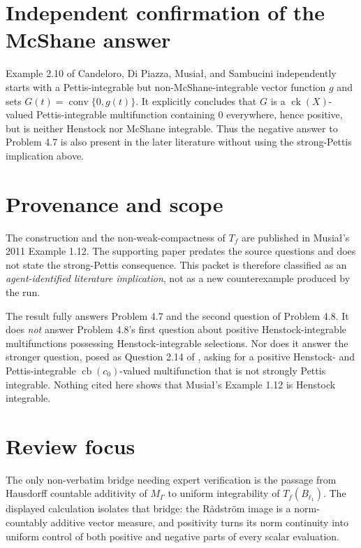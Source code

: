 \documentclass[11pt]{article}
\newcommand{\cb}{\operatorname{cb}}
\newcommand{\ck}{\operatorname{ck}}
\newcommand{\co}{\operatorname{conv}}
\begin{document}
\section*{Independent confirmation of the McShane answer}

Example 2.10 of Candeloro, Di Piazza, Musia{\l}, and Sambucini
\cite[PDF p.~9]{companion} independently starts with a Pettis-integrable but
non-McShane-integrable vector function $g$ and sets
$G(t)=\co\{0,g(t)\}$.  It explicitly concludes that $G$ is a
$\ck(X)$-valued Pettis-integrable multifunction containing $0$ everywhere,
hence positive, but is neither Henstock nor McShane integrable.  Thus the
negative answer to Problem 4.7 is also present in the later literature without
using the strong-Pettis implication above.

\section*{Provenance and scope}

The construction and the non-weak-compactness of $T_f$ are published in
Musia{\l}'s 2011 Example 1.12.  The supporting paper predates the source
questions and does not state the strong-Pettis consequence.  This packet is
therefore classified as an \emph{agent-identified literature implication},
not as a new counterexample produced by the run.

The result fully answers Problem 4.7 and the second question of Problem 4.8.
It does \emph{not} answer Problem 4.8's first question about positive
Henstock-integrable multifunctions possessing Henstock-integrable selections.
Nor does it answer the stronger question, posed as Question 2.14 of
\cite{companion}, asking for a positive Henstock- and Pettis-integrable
$\cb(c_0)$-valued multifunction that is not strongly Pettis integrable.
Nothing cited here shows that Musia{\l}'s Example 1.12 is Henstock integrable.

\section*{Review focus}

The only non-verbatim bridge needing expert verification is the passage from
Hausdorff countable additivity of $M_\Gamma$ to uniform integrability of
$T_f(B_{\ell_1})$.  The displayed calculation isolates that bridge: the
R\aa dstr\"om image is a norm-countably additive vector measure, and positivity
turns its norm continuity into uniform control of both positive and negative
parts of every scalar evaluation.
\end{document}
